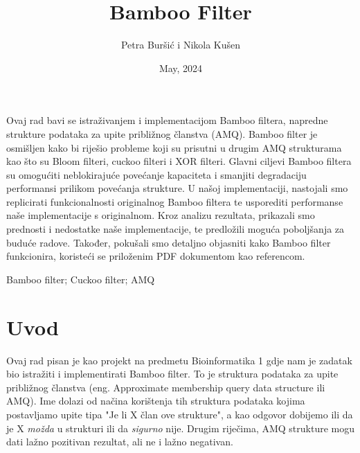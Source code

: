 \documentclass[seminarskirad]{fer}
\title{Bamboo Filter}
\author{Petra Buršić i Nikola Kušen}
\date{May, 2024}
\begin{document}
	
	\maketitle
	
	
	
	\begin{sazetak}
		Ovaj rad bavi se istraživanjem i implementacijom Bamboo filtera, napredne strukture podataka za upite približnog članstva (AMQ). Bamboo filter je osmišljen kako bi riješio probleme koji su prisutni u drugim AMQ strukturama kao što su Bloom filteri, cuckoo filteri i XOR filteri. Glavni ciljevi Bamboo filtera su omogućiti neblokirajuće povećanje kapaciteta i smanjiti degradaciju performansi prilikom povećanja strukture. U našoj implementaciji, nastojali smo replicirati funkcionalnosti originalnog Bamboo filtera te usporediti performanse naše implementacije s originalnom. Kroz analizu rezultata, prikazali smo prednosti i nedostatke naše implementacije, te predložili moguća poboljšanja za buduće radove. Također, pokušali smo detaljno objasniti kako Bamboo filter funkcionira, koristeći se priloženim PDF dokumentom kao referencom.
	\end{sazetak}
	
	\begin{kljucnerijeci}
		Bamboo filter; Cuckoo filter; AMQ
	\end{kljucnerijeci}
	
	\tableofcontents
	
	\chapter{Uvod}
	\label{pog:uvod}
	
	Ovaj rad pisan je kao projekt na predmetu Bioinformatika 1 gdje nam je zadatak bio istražiti i implementirati Bamboo filter. To je struktura podataka za upite približnog članstva (eng. Approximate membership query data structure ili AMQ). Ime dolazi od načina korištenja tih struktura podataka kojima postavljamo upite tipa "Je li X član ove strukture", a kao odgovor dobijemo ili da je X \textit{možda} u strukturi ili da \textit{sigurno} nije. Drugim riječima, AMQ strukture mogu dati lažno pozitivan rezultat, ali ne i lažno negativan.
	
\end{document}
